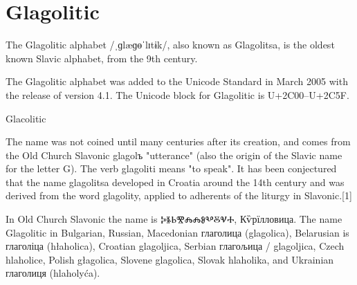 \let\glagolithic\pan

\section{Glagolitic}
\label{s:glagolitic}

\noindent
The Glagolitic alphabet /{\glagolithic ˌɡlæɡɵˈlɪtɨk/}, also known as Glagolitsa, is the oldest known Slavic alphabet, from the 9th century.

The Glagolitic alphabet was added to the Unicode Standard in March 2005 with the release of version 4.1.
The Unicode block for Glagolitic is U+2C00–U+2C5F.



\begin{scriptexample}[]{Glacolitic}


\end{scriptexample}
\arial

The name was not coined until many centuries after its creation, and comes from the Old Church Slavonic glagolъ "utterance" (also the origin of the Slavic name for the letter G). The verb glagoliti means "to speak". It has been conjectured that the name glagolitsa developed in Croatia around the 14th century and was derived from the word glagolity, applied to adherents of the liturgy in Slavonic.[1]

In Old Church Slavonic the name is {\glagolithic ⰍⰫⰓⰊⰎⰎⰑⰂⰋⰜⰀ}, Кѷрїлловица.
The name Glagolitic in Bulgarian, Russian, Macedonian глаголица (glagolica), Belarusian is глаголіца (hłaholica), Croatian glagoljica, Serbian глагољица / glagoljica, Czech hlaholice, Polish głagolica, Slovene glagolica, Slovak hlaholika, and Ukrainian глаголиця (hlaholyća).